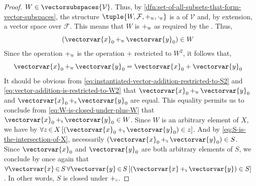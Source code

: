 \begin{proof}
    \( W \in \vectorsubspaces{\mathcal{V}} \). Thus, by \cref{dfn:set-of-all-subsets-that-form-vector-subspaces},
    the structure \( \tuple{W, \mathcal{F}, \smallsubscript{+}{W}, \smallsubscript{\cdot}{W}} \) is a
     of \( \mathcal{V} \) and, by extension, a vector space over \( \mathcal{F} \).
    This means that \( W \) is  \( \smallsubscript{+}{W} \) as required by
    the .
    Thus,
    \begin{equation}
        \label{eq:W-is-closed-under-plus-W}
        (\vectorvar{x}_{0} \, \smallsubscript{+}{W} \, \vectorvar{y}_{0}) \in W
    \end{equation}
    Since the operation \( \smallsubscript{+}{W} \) is the operation \( + \) restricted to \( W^{2} \), it follows that,
    \begin{equation}
        \label{eq:vector-addition-is-restricted-to-W2}
        \vectorvar{x}_{0} \, \smallsubscript{+}{W} \, \vectorvar{y}_{0} = \vectorvar{x}_{0} + \vectorvar{y}_{0}
    \end{equation}
    It should be obvious from \eqref{eq:instantiated-vector-addition-restricted-to-S2} and \eqref{eq:vector-addition-is-restricted-to-W2} that
    \( \vectorvar{x}_{0} \, \smallsubscript{+}{W} \, \vectorvar{y}_{0} \) and \(  \vectorvar{x}_{0} \, \smallsubscript{+}{S} \, \vectorvar{y}_{0} \)
    are equal. This equality permits us to conclude from \eqref{eq:W-is-closed-under-plus-W} that \( \vectorvar{x}_{0} \, \smallsubscript{+}{S} \, \vectorvar{y}_{0} \in W \).
    Since \( W \) is an arbitrary element of \( X \), we have by 
    \( \forall z\,{\in}\,X \, \mleft[ \mleft( \vectorvar{x}_{0} \, \smallsubscript{+}{S} \, \vectorvar{y}_{0} \mright) \in z \mright] \).
    And by \eqref{eq:S-is-the-intersection-of-X}, necessarily \( \mleft( \vectorvar{x}_{0} \, \smallsubscript{+}{S} \, \vectorvar{y}_{0} \mright) \in S \).
    Since \( \vectorvar{x}_{0} \) and \( \vectorvar{y}_{0} \) are both arbitrary elements of \( S \),
    we conclude by  once again that
    \(  \forall \vectorvar{x}\,{\in}\,S \, \forall \vectorvar{y}\,{\in}\,S \,
        \mleft[ \mleft( \vectorvar{x} \, \smallsubscript{+}{S} \, \vectorvar{y} \mright) \in S \mright] \).
    In other words, \( S \) is closed under \( \smallsubscript{+}{S} \).


\end{proof}
